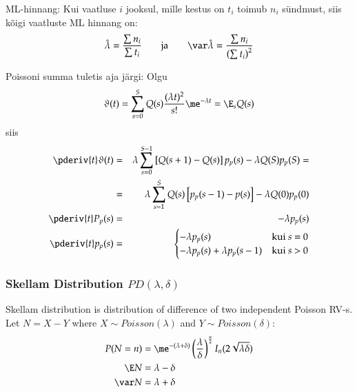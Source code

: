 \documentclass[a4paper]{article}
\numberwithin{equation}{subsection}
\begin{document}
ML-hinnang: Kui vaatluse $i$ jooksul, mille kestus on $t_i$ 
toimub $n_i$ sündmust, siis kõigi vaatluste ML hinnang on:
\begin{equation}
  \hat\lambda = \frac{\sum n_i}{\sum t_i} 
  \qquad \mbox{ja} \qquad
  \var\hat\lambda = \frac{\sum n_i}{\left( \sum t_i \right)^2}
\end{equation}

Poissoni summa tuletis aja järgi: Olgu
\begin{equation}
  \vartheta(t) =
  \sum_{s=0}^S Q(s) \frac{(\lambda t)^2}{s!} \me^{-\lambda t} = 
  \E_s Q(s)
\end{equation}
siis
\begin{eqnarray}
  \pderiv{t} \vartheta(t) &=&
  \lambda \sum_{s=0}^{S - 1}
  \left[ Q(s + 1) - Q(s) \right] p_p(s) -
  \lambda Q(S) p_p(S) =\\
  &=&
  \lambda \sum_{s=1}^S Q(s) 
  \left[ p_p(s - 1) - p(s) \right]
  - \lambda Q(0) p_p(0)\\
  \pderiv{t} P_p(s) &=& -\lambda p_p(s)\\
  \pderiv{t} p_p(s) &=&
  \begin{cases}
    -\lambda p_p(s) & \text{kui $s$ = 0}\\
    -\lambda p_p(s) + \lambda p_p(s-1) & \text{kui $s$ > 0}\\
  \end{cases}
\end{eqnarray}


\subsubsection{Skellam Distribution $PD(\lambda,\delta)$}
\label{sec:skellam_distribution}

Skellam distribution is distribution of difference of two independent
Poisson RV-s.  Let $N = X - Y$ where $X \sim Poisson(\lambda)$ and $Y
\sim Poisson(\delta)$:
\begin{align}
  P(N=n) &= 
  \me^{-(\lambda + \delta)}
  \left(\frac{\lambda}{\delta} \right)^{\frac{n}{2}}
  I_{n}(2\sqrt{\lambda\delta})
  \\
  \E N &= \lambda - \delta
  \\
  \var N &= \lambda + \delta
\end{align}



\newpage
\end{document}
